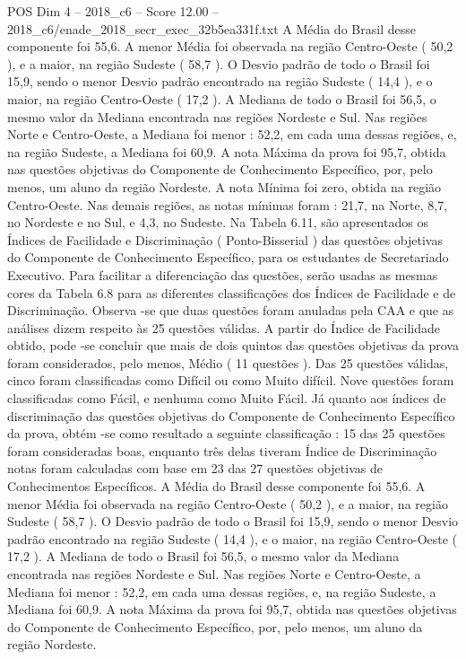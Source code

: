 \begin{textsample}{POS Dim 4 – 2018\_c6 – Score 12.00 – 2018\_c6/enade\_2018\_secr\_exec\_32b5ea331f.txt}
A Média do Brasil desse componente foi 55,6.
A menor Média foi observada na região Centro-Oeste ( 50,2 ), e a maior, na região Sudeste ( 58,7 ).
O Desvio padrão de todo o Brasil foi 15,9, sendo o menor Desvio padrão encontrado na região Sudeste ( 14,4 ), e o maior, na região Centro-Oeste ( 17,2 ).
A Mediana de todo o Brasil foi 56,5, o mesmo valor da Mediana encontrada nas regiões Nordeste e Sul.
Nas regiões Norte e Centro-Oeste, a Mediana foi menor : 52,2, em cada uma dessas regiões, e, na região Sudeste, a Mediana foi 60,9.
A nota Máxima da prova foi 95,7, obtida nas questões objetivas do Componente de Conhecimento Específico, por, pelo menos, um aluno da região Nordeste.
A nota Mínima foi zero, obtida na região Centro-Oeste.
Nas demais regiões, as notas mínimas foram : 21,7, na Norte, 8,7, no Nordeste e no Sul, e 4,3, no Sudeste.
Na Tabela 6.11, são apresentados os Índices de Facilidade e Discriminação ( Ponto-Bisserial ) das questões objetivas do Componente de Conhecimento Específico, para os estudantes de Secretariado Executivo.
Para facilitar a diferenciação das questões, serão usadas as mesmas cores da Tabela 6.8 para as diferentes classificações dos Índices de Facilidade e de Discriminação.
Observa -se que duas questões foram anuladas pela CAA e que as análises dizem respeito às 25 questões válidas.
A partir do Índice de Facilidade obtido, pode -se concluir que mais de dois quintos das questões objetivas da prova foram considerados, pelo menos, Médio ( 11 questões ).
Das 25 questões válidas, cinco foram classificadas como Difícil ou como Muito difícil.
Nove questões foram classificadas como Fácil, e nenhuma como Muito Fácil.
Já quanto aos índices de discriminação das questões objetivas do Componente de Conhecimento Específico da prova, obtém -se como resultado a seguinte classificação : 15 das 25 questões foram consideradas boas, enquanto três delas tiveram Índice de Discriminação notas foram calculadas com base em 23 das 27 questões objetivas de Conhecimentos Específicos.
A Média do Brasil desse componente foi 55,6.
A menor Média foi observada na região Centro-Oeste ( 50,2 ), e a maior, na região Sudeste ( 58,7 ).
O Desvio padrão de todo o Brasil foi 15,9, sendo o menor Desvio padrão encontrado na região Sudeste ( 14,4 ), e o maior, na região Centro-Oeste ( 17,2 ).
A Mediana de todo o Brasil foi 56,5, o mesmo valor da Mediana encontrada nas regiões Nordeste e Sul.
Nas regiões Norte e Centro-Oeste, a Mediana foi menor : 52,2, em cada uma dessas regiões, e, na região Sudeste, a Mediana foi 60,9.
A nota Máxima da prova foi 95,7, obtida nas questões objetivas do Componente de Conhecimento Específico, por, pelo menos, um aluno da região Nordeste.

\end{textsample}
